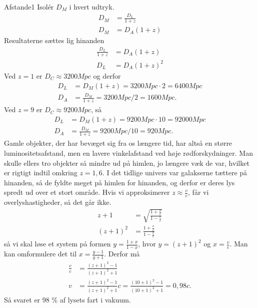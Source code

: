 \begin{opgave}{Afstande}{1}
	\opg Isolér $D_M$ i hvert udtryk.
	\begin{align}
		D_M &= \frac{D_L}{1+z}\\
		D_M &= D_A(1+z)
	\end{align}
	Resultaterne sættes lig hinanden
		\begin{align}
		\frac{D_L}{1+z} &= D_A(1+z)\\
		D_L &= D_A (1+z)^2
		\end{align}
	\opg Ved $z=1$ er $D_C\approx3200 Mpc$ og derfor
	\begin{align}
		D_L &= D_M(1+z)= 3200 Mpc \cdot 2 = 6400 Mpc\\
		D_A &= \frac{D_M}{1+z}= 3200 Mpc/ 2 = 1600 Mpc.
	\end{align}
	Ved $z=9$ er $D_C\approx9200 Mpc$, så
	\begin{align}
		D_L &= D_M(1+z)= 9200 Mpc \cdot 10 = 92000 Mpc\\
		D_A &= \frac{D_M}{1+z}= 9200 Mpc/ 10 = 920 Mpc.
	\end{align}
	Gamle objekter, der har bevæget sig fra os længere tid, har altså en større luminositetsafstand, men en lavere vinkelafstand ved høje rødforskydninger. Man skulle ellers tro objekter så mindre ud på himlen, jo længere væk de var, hvilket er rigtigt indtil omkring $z=1,6$. I det tidlige univers var galakserne tættere på hinanden, så de fyldte meget på himlen for hinanden, og derfor er deres lys spredt ud over et stort område.
	\opg
	Hvis vi approksimerer $z\approx\frac{v}{c}$, får vi overlyshastigheder, så det går ikke.
	\begin{align}
	z+1&=\sqrt{\frac{1+\frac{v}{c}}{1-\frac{v}{c}}}\\
	(z+1)^2&=\frac{1+\frac{v}{c}}{1-\frac{v}{c}}
	\end{align}
	så vi skal løse et system på formen $y=\frac{1+x}{1-x}$, hvor $y=(z+1)^2$ og $x=\frac{v}{c}$. Man kan omformulere det til $x=\frac{y-1}{y+1}$. Derfor må
	\begin{align}
	\frac{v}{c}&=\frac{(z+1)^2-1}{(z+1)^2+1}\\
	v&=\frac{(z+1)^2-1}{(z+1)^2+1} c = \frac{(10+1)^2-1}{(10+1)^2+1} = 0,98 c. %
	\end{align}
	Så svaret er 98 \% af lysets fart i vakuum.
\end{opgave}

